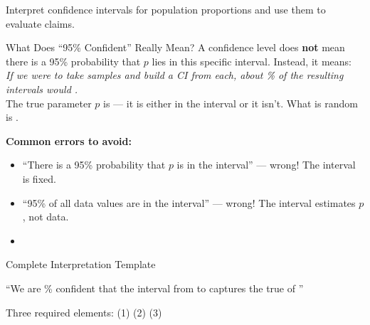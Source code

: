 \documentclass[10pt]{article}
\begin{document}
\namedateperiod

\vspace{0.15in}

\begin{objectivebox}
Interpret confidence intervals for population proportions and use them to evaluate claims.
\end{objectivebox}

\begin{notesbox}{What Does ``95\% Confident'' Really Mean?}
A confidence level does \textbf{not} mean there is a 95\% probability that $p$ lies in this
specific interval. Instead, it means: \\[4pt]
\textit{If we were to take  samples and build a CI from each, about \%
of the resulting intervals would .} \\[4pt]
The true parameter $p$ is  --- it is either in the interval or it isn't. What is
random is .

\vspace{4pt}
\textbf{Common errors to avoid:}
\begin{itemize}
  \item[\textbf{$\times$}] ``There is a 95\% probability that $p$ is in the interval'' --- wrong! The interval is fixed.
  \item[\textbf{$\times$}] ``95\% of all data values are in the interval'' --- wrong! The interval estimates $p$, not data.
  \item[\checkmark] 
\end{itemize}
\end{notesbox}

\begin{notesbox}{Complete Interpretation Template}
\begin{center}
\begin{tcolorbox}[colback=goldbg, colframe=goldacc, boxrule=0.8pt, width=0.92\linewidth]
``We are \% confident that the interval from  to 
captures the true  of ''
\end{tcolorbox}
\end{center}

\vspace{4pt}
Three required elements: \quad (1)  \quad (2)  \quad (3) 
\end{notesbox}
\end{document}
